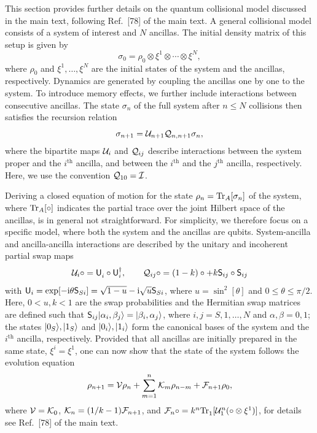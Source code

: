 \documentclass[aps,prl,reprint]{revtex4-2}
\begin{document}
This section provides further details on the quantum collisional model discussed in the main text, following Ref.~[78] of the main text.
A general collisional model consists of a system of interest and $N$ ancillas.
The initial density matrix of this setup is given by
\begin{equation}
\sigma_0 = \rho_0 \otimes \xi^1 \otimes \cdots \otimes \xi^N,
\end{equation}
where $\rho_0$ and $\xi^{1},\dots,\xi^N$ are the initial states of the system and the ancillas, respectively.
Dynamics are generated by coupling the ancillas one by one to the system.
To introduce memory effects, we further include interactions between consecutive ancillas.
The state $\sigma_n$ of the full system after $n\leq N$ collisions then satisfies the recursion relation
\begin{equation}
\sigma_{n+1}   = \mathcal{U}_{n+1} \mathcal{Q}_{n,n+1}\sigma_n,
\end{equation}
where the bipartite maps $\mathcal{U}_i$ and $\mathcal{Q}_{ij}$ describe interactions between the system proper and the $i^\mathrm{th}$ ancilla, and between the $i^\mathrm{th}$ and the $j^\mathrm{th}$ ancilla, respectively.
Here, we use the convention $\mathcal{Q}_{10}=\mathcal{I}$.

Deriving a closed equation of motion for the state $\rho_n = \mathrm{Tr}_A[\sigma_n]$ of the system, where $\mathrm{Tr}_A[\circ]$ indicates the partial trace over the joint Hilbert space of the ancillas, is in general not straightforward.
For simplicity, we therefore focus on a specific model, where both the system and the ancillas are qubits.
System-ancilla and ancilla-ancilla interactions are described by the unitary and incoherent partial swap maps
\begin{equation}
\mathcal{U}_i\circ = \mathsf{U}_i^{\vphantom{\dagger}}\circ\mathsf{U}_i^\dagger, \qquad
\mathcal{Q}_{ij}\circ = (1-k)\circ+k\mathsf{S}_{ij}\circ\mathsf{S}_{ij}
\end{equation}
with $\mathsf{U}_i=\exp[-\mathrm{i}\theta\mathsf{S}_{Si}]=\sqrt{1-u}-\mathrm{i}\sqrt{u}\mathsf{S}_{Si}$, where $u=\sin^ 2[\theta]$ and $0\leq \theta\leq\pi/2$.
Here, $0<u,k<1$ are the swap probabilities and the Hermitian swap matrices are defined such that $\mathsf{S}_{ij}\lvert \alpha_i,\beta_j \rangle=\lvert \beta_i,\alpha_j \rangle$, where $i,j=S,1,\dots,N$ and $\alpha,\beta =0,1$; the states $\lvert 0_S \rangle, \lvert 1_S \rangle$ and $\lvert 0_i \rangle, \lvert 1_i \rangle$ form the canonical bases of the system and the $i^\mathrm{th}$ ancilla, respectively.
Provided that all ancillas are initially prepared in the same state, $\xi^i = \xi^1$, one can now show that the state of the system follows the evolution equation
\begin{equation}\label{eq:cm:NLEEQ}
\rho_{n+1} = \mathcal{V}\rho_n + \sum_{m=1}^n\mathcal{K}_m\rho_{n-m}+\mathcal{F}_{n+1}\rho_0,
\end{equation}
where $\mathcal{V}=\mathcal{K}_0$, $\mathcal{K}_n= (1/k -1)\mathcal{F}_{n+1}$, and $\mathcal{F}_n\circ=k^n\mathrm{Tr}_1^{\vphantom{n}}[\mathcal{U}_1^n(\circ\otimes\xi^1)]$, for details see Ref.~[78] of the main text.
\end{document}
